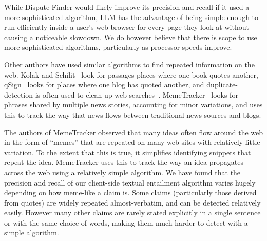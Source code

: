 \documentclass{www2010-accepted}
\newcommand{\todo}[1]{}
\begin{document}
While Dispute Finder would likely improve its precision and recall if it used a more sophisticated algorithm, LLM has the advantage of being simple enough to run efficiently inside a user's web browser for every page they look at without causing a noticeable slowdown. We do however believe that there is scope to use more sophisticated algorithms, particularly as processor speeds improve.


\todo{Mention that we could add the +ve and -ve n-grams to the client code? Actually do this?}

\todo{Discuss how and why this is simpler than the server-side classification method}
\todo{Explain how we avoid downloading the entire database}

\todo{Should we have a version where the interface merely suggests n-grams that should be used by the classifier}
\todo{Can we present all these systems without giving detailed stats about how they compare?}
\todo{Add support for a user to enter 'anti-phrases' when a snippet is wrongly highlighted}
\todo{Add support for a user to enter a paraphrase that will match the snippet they are looking at}
\todo{Do a load more people in a final user-study round. Try to get it up to 8.}
\todo{Explain how our algorithm relates to existing NLP work - due to unusual domain}


Other authors have used similar algorithms to find repeated information on the web. Kolak and Schilit~\cite{Kolak2008} look for passages places where one book quotes another, qSign~\cite{Kim2009} looks for places where one blog has quoted another, and duplicate-detection is often used to clean up web searches~\cite{Theobald2008}. MemeTracker~\cite{Backstrom2009} looks for phrases shared by multiple news stories, accounting for minor variations, and uses this to track the way that news flows between traditional news sources and blogs.

The authors of MemeTracker observed that many ideas often flow around the web in the form of ``memes'' that are repeated on many web sites with relatively little variation. To the extent that this is true, it simplifies identifying snippets that repeat the idea. MemeTracker uses this to track the way an idea propagates across the web using a relatively simple algorithm. We have found that the precision and recall of our client-side textual entailment algorithm varies hugely depending on how meme-like a claim is. Some claims (particularly those derived from quotes) are widely repeated almost-verbatim, and can be detected relatively easily. However many other claims are rarely stated explicitly in a single sentence or with the same choice of words, making them much harder to detect with a simple algorithm.
\end{document}
